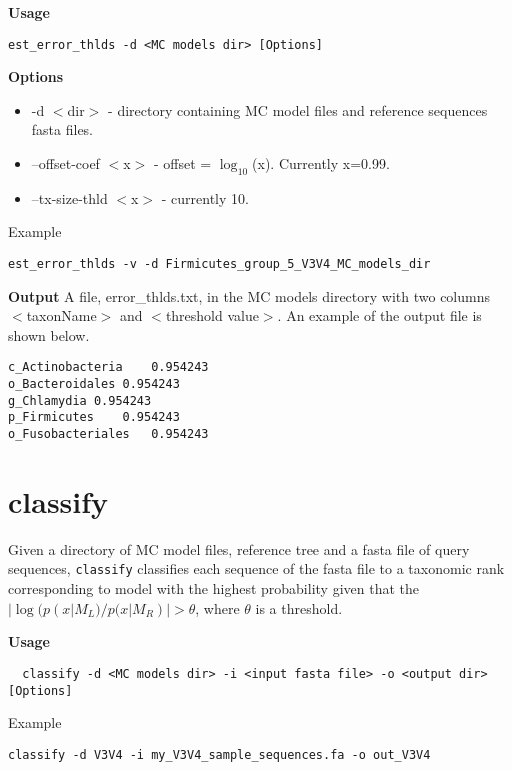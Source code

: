 \documentclass{article}
\newcommand{\logT}{\ensuremath{\log_{10}}\xspace}
\newcommand{\<}{\ensuremath{<}}
\renewcommand{\>}{\ensuremath{>}}
\begin{document}
\textbf{Usage}
\begin{verbatim}
est_error_thlds -d <MC models dir> [Options]
\end{verbatim}
\vspace{7pt}
\textbf{Options}
\tightlists
\begin{itemize}
\item -d \<dir\>   - directory containing MC model files and reference
  sequences fasta files.
\item --offset-coef \<x\>  - offset = \logT(x). Currently x=0.99.
\item --tx-size-thld \<x\> - currently 10.
\end{itemize}

Example
\begin{verbatim}
est_error_thlds -v -d Firmicutes_group_5_V3V4_MC_models_dir
\end{verbatim}

\noindent\textbf{Output} A file, error\_thlds.txt, in the MC models directory
with two columns \<taxonName\> and \<threshold value\>. An example of the output
file is shown below.
\begin{verbatim}
c_Actinobacteria	0.954243
o_Bacteroidales	0.954243
g_Chlamydia	0.954243
p_Firmicutes	0.954243
o_Fusobacteriales	0.954243
\end{verbatim}


\section*{classify}

Given a directory of MC model files, reference tree and a fasta file of query sequences,
\verb+classify+ classifies each sequence of the fasta file to a taxonomic rank corresponding to model
with the highest probability given that the $| \log( p(x | M_L) / p(x | M_R) | >
\theta$, where $\theta$ is a threshold.

\textbf{Usage}
\begin{verbatim}
  classify -d <MC models dir> -i <input fasta file> -o <output dir> [Options]
\end{verbatim}
Example
\begin{verbatim}
classify -d V3V4 -i my_V3V4_sample_sequences.fa -o out_V3V4
\end{verbatim}
\end{document}

